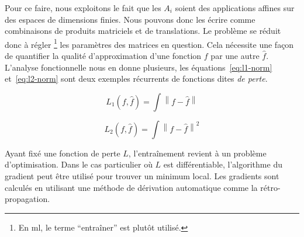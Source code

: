 Pour ce faire, nous exploitons le fait que 
les \(A_i\) soient des applications affines sur des espaces de dimensions finies.
Nous pouvons donc les écrire comme combinaisons de produits matriciels et de translations.
Le problème se réduit donc à régler \footnote{En \gls{ml}, le terme ``entraîner'' est plutôt utilisé.}
les paramètres des matrices en question. 
Cela nécessite une façon de quantifier la qualité d'approximation d'une fonction \(f\) par une autre \(\hat{f}\).
L'analyse fonctionnelle nous en donne plusieurs, 
les équations~\ref{eq:l1-norm} et~\ref{eq:l2-norm} 
sont deux exemples récurrents de fonctions dites \emph{de perte}.

\begin{equation}
    \label{eq:l1-norm}
    L_1(f, \hat{f}) = \int \left\|f - \hat{f}\right\|
\end{equation}

\begin{equation}
    \label{eq:l2-norm}
    L_2(f, \hat{f}) = \int \left\|f - \hat{f}\right\|^2
\end{equation}

Ayant fixé une fonction de perte \(L\), l'entraînement revient à un problème d'optimisation.
Dans le cas particulier où \(L\) est différentiable, 
l'algorithme du gradient peut être utilisé pour trouver un minimum local.
Les gradients sont calculés en utilisant une méthode de dérivation automatique comme la rétro-propagation.
